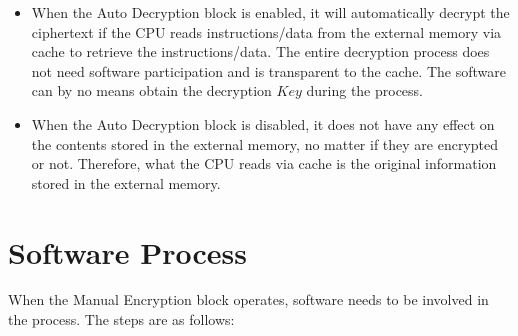 \documentclass[main\_\_EN.tex]{subfiles}
\begin{document}
\begin{tiplisting}
\vspace{-2em}
\begin{itemize}

\item When the Auto Decryption block is enabled, it will automatically decrypt the ciphertext if the CPU reads instructions/data from the external memory via cache to retrieve the instructions/data. The entire decryption process does not need software participation and is transparent to the cache. The software can by no means obtain the decryption \begin{math}\mathit{Key}\end{math} during the process.

\item When the Auto Decryption block is disabled, it does not have any effect on the contents stored in the external memory, no matter if they are encrypted or not. Therefore, what the CPU reads via cache is the original information stored in the external memory.

\end{itemize}
\end{tiplisting}


\section{ Software Process }

When the Manual Encryption block operates, software needs to be involved in the process. The steps are as follows:
\end{document}
